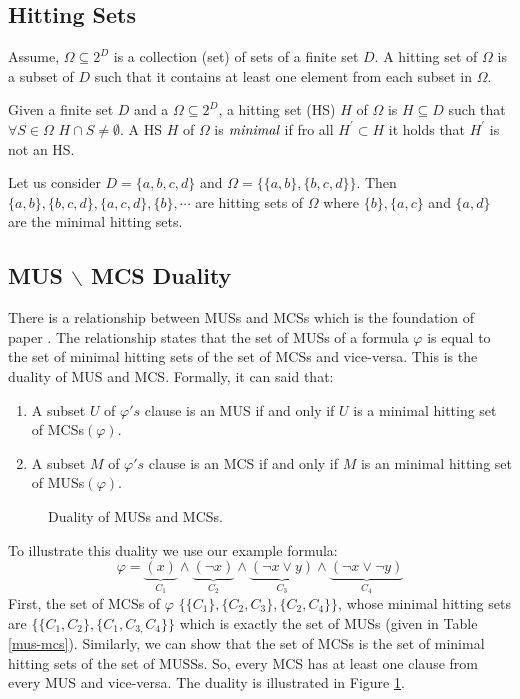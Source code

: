 \subsection{Hitting Sets}
Assume, $\Omega \subseteq 2^{D}$ is a collection (set) of sets of a finite set $D$. A hitting set of $\Omega$ is a subset of $D$ such that it contains at least one element from each subset in $\Omega$.
\begin{definition}
Given a finite set $D$ and a $\Omega \subseteq 2^{D}$, a hitting set (HS) $H$ of $\Omega$ is $H\subseteq D$ such that $\forall S\in \Omega$ $H\cap S\neq \emptyset$. A HS $H$ of $\Omega$ is $\emph{minimal}$ if fro all $H^{\prime}\subset H$ it holds that $H^{\prime}$ is not an HS.
\end{definition}
\begin{example}
Let us consider $D=\{a, b,c,d\}$ and $\Omega=\{\{a, b\}, \{b, c, d\}\}$. Then $\{a,b\}, \{b,c,d\}, \{a,c,d\}, \{b\},\cdots$ are hitting sets of $\Omega$ where $\{b\}, \{a,c\} $ and $ \{a,d\}$ are the minimal hitting sets.	
\end{example}
\subsection{MUS $\backslash$ MCS Duality}
There is a relationship between MUSs and MCSs which is the foundation of paper \cite{karem}. The relationship states that the set of MUSs of a formula $\varphi$ is equal to the set of minimal hitting sets of the set of MCSs and vice-versa. This is the duality of MUS and MCS. Formally, it can said that:
\begin{enumerate}
	\item A subset $U$ of $\varphi 's$ clause is an MUS if and only if $U$ is a minimal hitting set of MCSs$(\varphi)$.
	\item A subset $M$ of $\varphi 's$ clause is an MCS if and only if $M$ is an minimal hitting set of MUSs$(\varphi)$.
\end{enumerate}
\begin{figure}[htb]
	\begin{center}
		
	\end{center}
	\caption{Duality of MUSs and MCSs.}
	\label{fig:graph}
\end{figure}

\begin{example}
		To illustrate this duality we use our example formula: $$\varphi=\underbrace{(x)}\limits_{C_{1}}\wedge\underbrace{(\neg x)}\limits_{C_{2}}\wedge\underbrace{(\neg x\vee y)}\limits_{C_{3}}\wedge\underbrace{(\neg x \vee \neg y)}\limits_{C_{4}}$$ First, the set of MCSs of $\varphi$  $\{\{C_{1}\}, \{C_{2}, C_{3}\}, \{C_{2}, C_{4}\}\}$, whose minimal hitting sets are $\{\{C_{1}, C_{2}\}, \{C_{1}, C_{3,} C_{4}\}\}$ which is exactly the set of MUSs (given in Table \ref{mus-mcs}). Similarly, we can show that the set of MCSs is the set of minimal hitting sets of the set of MUSSs. So, every MCS has at least one clause from every MUS and vice-versa. The duality is illustrated in Figure \ref{fig:graph}.
	
\end{example}
